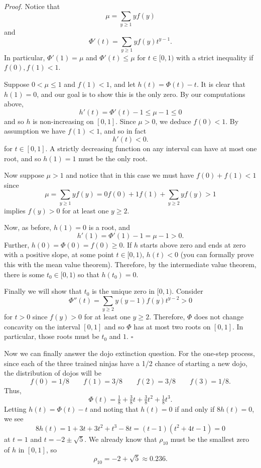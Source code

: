\documentclass{problemset}
\newenvironment{proof}{\emph{Proof.}}{\hfill$\square$}
\begin{document}
	\begin{proof}
		Notice that
		\[
			\mu = \sum_{y\geq 1} yf(y)
		\]
		and
		\[
			\Phi'(t) = \sum_{y\geq 1} yf(y) t^{y-1}.
		\]
		In particular, $\Phi'(1) =\mu$ and $\Phi'(t) \leq \mu$ for $t\in [0,1)$ with 
			a strict inequality if $f(0),f(1)<1$.

		Suppose $0<\mu\leq 1$ and $f(1) < 1$, and let $h(t) = \Phi(t)-t$.  It is clear that
		$h(1)=0$, and our goal is to show this is the only zero.  By our computations above,
		\[
			h'(t) = \Phi'(t) - 1\leq \mu-1 \leq 0
		\]
		and so $h$ is non-increasing on $[0,1]$.  Since $\mu >0$, we deduce $f(0)<1$.  By assumption
		we have $f(1) < 1$, and so in fact
		\[
			h'(t) < 0.
		\]
		for $t\in[0,1]$.  A strictly decreasing function on any interval can have at most one root,
		and so $h(1)=1$ must be the only root.

		Now suppose $\mu > 1$ and notice that in this case we must have $f(0)+f(1) < 1$ since
		\[
			\mu = \sum_{y\geq 1} yf(y) = 0f(0) +1f(1) + \sum_{y\geq 2} yf(y) > 1
		\]
		implies $f(y) > 0$ for at least one $y\geq 2$.

		Now, as before, $h(1)=0$ is a root, and 
		\[
			h'(1) = \Phi'(1) - 1=\mu-1 > 0.
		\]
		Further, $h(0)=\Phi(0) = f(0)\geq 0$.  If $h$ starts above zero
		and ends at zero with a positive slope, at some point $t\in[0,1)$,
			$h(t)<0$ (you can formally
			prove this with the mean value theorem).  
			Therefore, by the intermediate value theorem, there is some $t_0\in[0,1)$
				so that $h(t_0)=0$.

		Finally we will show that $t_0$ is the unique zero in $[0,1)$.  Consider
		\[
			\Phi''(t) = \sum_{y\geq 2} y(y-1)f(y)t^{y-2} > 0
		\]
		for $t>0$ since $f(y)>0$ for at least one $y\geq 2$.  Therefore, $\Phi$ does not
		change concavity on the interval $[0,1]$ and so $\Phi$ has at most two roots 
		on $[0,1]$.  In particular, those roots must be $t_0$ and $1$.
	\end{proof}

	Now we can finally answer the dojo extinction question.  For the one-step process,
	since each of the three trained ninjas have a 1/2 chance of starting a new dojo, 
	the distribution of dojos will be
	\[
		f(0) = 1/8\qquad f(1)=3/8 \qquad f(2)=3/8 \qquad f(3) = 1/8.
	\]
	Thus, 
	\[
		\Phi(t) = \tfrac{1}{8} + \tfrac{3}{8}t + \tfrac{3}{8}t^2+\tfrac{1}{8}t^3.
	\]
	Letting $h(t) = \Phi(t)-t$ and noting that $h(t)=0$ if and only if $8h(t)=0$, 
	we see
	\[
		8h(t) = 1+3t+3t^2+t^3-8t = (t-1)(t^2+4t-1)=0
	\]
	at $t=1$ and $t=-2\pm \sqrt{5}$.  We already know that $\rho_{10}$ must be the smallest 
	zero of $h$ in $[0,1]$, so 
	\[
		\rho_{10} = -2+\sqrt{5} \approx 0.236.
	\]
	
\end{document}
